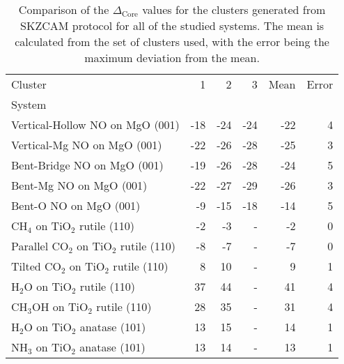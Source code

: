 \begin{table}
\caption{\label{tab:deltacore}Comparison of the $\Delta_\textrm{Core}$ values for the clusters generated from SKZCAM protocol for all of the studied systems. The mean is calculated from the set of clusters used, with the error being the maximum deviation from the mean.}
\begin{adjustbox}{center,max width=1\textwidth}
\begin{tabular}{lrrrrr}
\toprule
Cluster & 1 & 2 & 3 & Mean & Error \\ 
System &  &  &  &  &  \\
\midrule
Vertical-Hollow NO on MgO (001) & -18 & -24 & -24 & -22 & 4 \\
Vertical-Mg NO on MgO (001) & -22 & -26 & -28 & -25 & 3 \\
Bent-Bridge NO on MgO (001) & -19 & -26 & -28 & -24 & 5 \\
Bent-Mg NO on MgO (001) & -22 & -27 & -29 & -26 & 3 \\
Bent-O NO on MgO (001) & -9 & -15 & -18 & -14 & 5 \\
CH$_4$ on TiO$_2$ rutile (110) & -2 & -3 & - & -2 & 0 \\
Parallel CO$_2$ on TiO$_2$ rutile (110) & -8 & -7 & - & -7 & 0 \\
Tilted CO$_2$ on TiO$_2$ rutile (110) & 8 & 10 & - & 9 & 1 \\
H$_2$O on TiO$_2$ rutile (110) & 37 & 44 & - & 41 & 4 \\
CH$_3$OH on TiO$_2$ rutile (110) & 28 & 35 & - & 31 & 4 \\
H$_2$O on TiO$_2$ anatase (101) & 13 & 15 & - & 14 & 1 \\
NH$_3$ on TiO$_2$ anatase (101) & 13 & 14 & - & 13 & 1 \\
\bottomrule
\end{tabular}
\end{adjustbox}
\end{table}